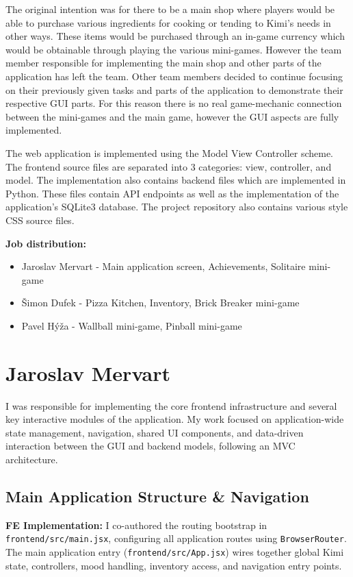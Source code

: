\documentclass[11pt]{article}
\begin{document}
The original intention was for there to be a main shop where players would be able to purchase various ingredients for cooking or tending to Kimi's needs in other ways. These items would be purchased through an in-game currency which would be obtainable through playing the various mini-games. However the team member responsible for implementing the main shop and other parts of the application has left the team. Other team members decided to continue focusing on their previously given tasks and parts of the application to demonstrate their respective GUI parts. For this reason there is no real game-mechanic connection between the mini-games and the main game, however the GUI aspects are fully implemented.

The web application is implemented using the Model View Controller scheme. The frontend source files are separated into 3 categories: view, controller, and model. The implementation also contains backend files which are implemented in Python. These files contain API endpoints as well as the implementation of the application's SQLite3 database. The project repository also contains various style CSS source files.

\vspace{1cm}
\textbf{Job distribution:}
\begin{itemize}
    \item Jaroslav Mervart - Main application screen, Achievements, Solitaire mini-game
    
    \item Šimon Dufek - Pizza Kitchen, Inventory, Brick Breaker mini-game
    
    \item Pavel Hýža - Wallball mini-game, Pinball mini-game
\end{itemize}


\newpage

\section{Jaroslav Mervart}

I was responsible for implementing the core frontend infrastructure and several key interactive modules of the application. My work focused on application-wide state management, navigation, shared UI components, and data-driven interaction between the GUI and backend models, following an MVC architecture.

\subsection{Main Application Structure \& Navigation}
\textbf{FE Implementation:}
I co-authored the routing bootstrap in \texttt{frontend/src/main.jsx}, configuring all application routes using \texttt{BrowserRouter}. The main application entry (\texttt{frontend/src/App.jsx}) wires together global Kimi state, controllers, mood handling, inventory access, and navigation entry points.
\end{document}

